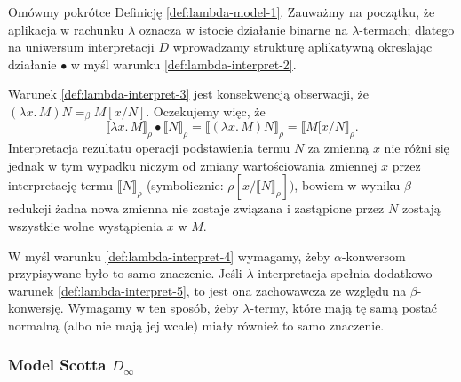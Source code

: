 \begin{definicja}
\end{definicja}

Omówmy pokrótce Definicję \ref{def:lambda-model-1}. Zauważmy na początku, że aplikacja w rachunku \(\lambda\) oznacza w istocie działanie binarne na \(\lambda\)-termach; dlatego na uniwersum interpretacji \(D\) wprowadzamy strukturę aplikatywną okreslając działanie \(\bullet\) w myśl warunku \ref{def:lambda-interpret-2}.

Warunek \ref{def:lambda-interpret-3} jest konsekwencją obserwacji, że \((\lambda x.\,M) N =_\beta M[x/N]\). Oczekujemy więc, że 
\[
  \llbracket \lambda x.\,M \rrbracket_\rho \bullet \llbracket N \rrbracket_\rho =
  \llbracket (\lambda x.\,M) N\rrbracket_\rho = \llbracket M[x/N \rrbracket_\rho.
\]
Interpretacja rezultatu operacji podstawienia termu \(N\) za zmienną \(x\) nie różni się jednak w tym wypadku niczym od zmiany wartościowania zmiennej \(x\) przez interpretację termu \(\llbracket N\rrbracket_\rho\) (symbolicznie: \(\rho[x/\llbracket N \rrbracket_\rho])\), bowiem w wyniku \(\beta\)-redukcji żadna nowa zmienna nie zostaje związana i zastąpione przez \(N\) zostają wszystkie wolne wystąpienia \(x\) w \(M\).

W myśl warunku \ref{def:lambda-interpret-4} wymagamy, żeby \(\alpha\)-konwersom przypisywane było to samo znaczenie. Jeśli \(\lambda\)-interpretacja spełnia dodatkowo warunek \ref{def:lambda-interpret-5}, to jest ona zachowawcza ze względu na \(\beta\)-konwersję. Wymagamy w ten sposób, żeby \(\lambda\)-termy, które mają tę samą postać normalną (albo nie mają jej wcale) miały również to samo znaczenie.

\subsubsection{Model Scotta \(D_\infty\)}

